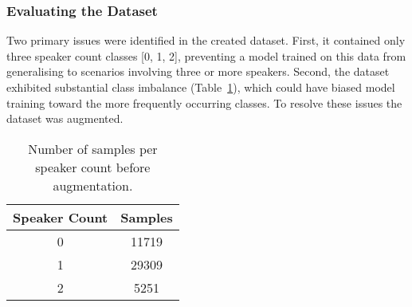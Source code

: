 \subsubsection{Evaluating the Dataset}
Two primary issues were identified in the created dataset. First, it contained only three speaker count classes [0, 1, 2], preventing a model trained on this data from generalising to scenarios involving three or more speakers. Second, the dataset exhibited substantial class imbalance (Table~\ref{tab:samples_pre_aug}), which could have biased model training toward the more frequently occurring classes. To resolve these issues the dataset was augmented.

\begin{table}[H]
  \centering
  \caption{Number of samples per speaker count before augmentation.}
  \label{tab:samples_pre_aug}
  \begin{tabular}{|c|c|}
    \hline
    \textbf{Speaker Count} & \textbf{Samples} \\
    \hline
    0 & 11719 \\
    \hline
    1 & 29309 \\
    \hline
    2 & 5251 \\
    \hline
  \end{tabular}
\end{table}


